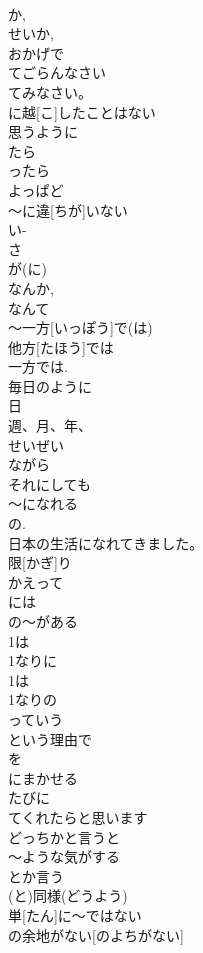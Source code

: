 \documentclass[8pt]{extreport}
\begin{document}
\begin{CJK}{UTF8}{min}
\\	か, 
\\	せいか, 
\\	おかげで	
\\	てごらんなさい	
\\	てみなさい。
\\	に越[こ]したことはない	
\\	思うように	
\\	たら 
\\	ったら	
\\	よっぱど	
\\	～に違[ちが]いない	
\\	い-
\\	さ
\\	が(に)	
\\	なんか, 
\\	なんて	
\\	～一方[いっぽう]で(は)	
\\	他方[たほう]では 
\\	一方では.
\\	毎日のように	
\\	日 
\\	週、月、年、
\\	せいぜい	
\\	ながら	
\\	それにしても	
\\	～になれる	
\\	の. 
\\	日本の生活になれてきました。
\\	限[かぎ]り	
\\	かえって	
\\	には
\\	の～がある	
\\	1は
\\	1なりに
\\	1は
\\	1なりの
\\	っていう 
\\	という理由で	
\\	を
\\	にまかせる	
\\	たびに
\\	てくれたらと思います	
\\	どっちかと言うと	
\\	～ような気がする	
\\	とか言う	
\\	(と)同様(どうよう)	
\\	単[たん]に～ではない	
\\	の余地がない[のよちがない]	

\end{CJK}
\end{document}

